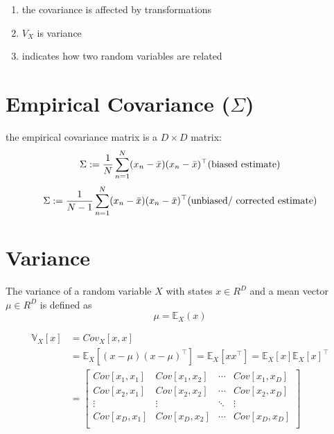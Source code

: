 \begin{enumerate}
\begin{enumerate}
    \end{enumerate}

    \item the covariance is affected by transformations
    
    \item $V_X$ is variance

    \item indicates how two random variables are related

\end{enumerate}

\section{Empirical Covariance ($\Sigma$) \cite{mfml-1}}\label{Multivariate Distributions: Empirical Covariance}

the empirical covariance matrix is a $D\times D$ matrix:
\[
    \Sigma
    := \dfrac{1}{N}
    \dsum_{n=1}^{N}
    (x_n - \bar{x})(x_n - \bar{x})^\top
    \hfill
    \text{(biased estimate)}
\]
\[
    \Sigma
    := \dfrac{1}{N-1}
    \dsum_{n=1}^{N}
    (x_n - \bar{x})(x_n - \bar{x})^\top
    \hfill
    \text{(unbiased/ corrected estimate)}
\]


\section{Variance \cite{mfml-1}}\label{Multivariate Distributions: Variance}

The variance of a random variable $X$ with states $x \in R^D$ and a mean vector $\mu \in R^D$ is defined as
\[
    \mu = \mathbb{E}_X(x)
\]

\begin{align*}
    \mathbb{V}_X[x] 
    &= Cov_X[x,x]\\
    &= \mathbb{E}_X[(x-\mu)(x-\mu)^\top]
    = \mathbb{E}_X[xx^\top]
    = \mathbb{E}_X[x]\mathbb{E}_X[x]^\top\\
    &= \begin{bmatrix}
        Cov[x_1,x_1] & Cov[x_1,x_2] & \cdots & Cov[x_1,x_D]\\
        Cov[x_2,x_1] & Cov[x_2,x_2] & \cdots & Cov[x_2,x_D]\\
        \vdots & \vdots & \ddots & \vdots \\
        Cov[x_D,x_1] & Cov[x_D,x_2] & \cdots & Cov[x_D,x_D]\\
    \end{bmatrix}
\end{align*}

